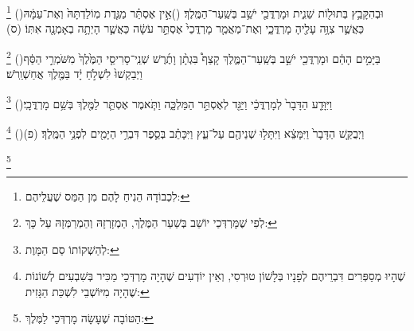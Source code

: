\documentclass[12pt, openany]{book}
\newcommand{\footnotecomment}[1]{
	\renewcommand\thefootnote{}
	\footnote{\textsf{#1}}}
\newcommand{\commenta}[1]{\footnotecomment{#1}\hspace{0em}}
\newcommand{\vsnum}[1]{(\hebrewnumeral{#1})\space}
\begin{document}
\begin{multicols}{2}
\commenta{ לִכְבוֹדָהּ הֵנִיחַ לָהֶם מִן הַמַּס שֶׁעֲלֵיהֶם:}%
\vsnum{19}וּבְהִקָּבֵ֥ץ בְּתוּל֖וֹת שֵׁנִ֑ית וּמָרְדֳּכַ֖י יֹשֵׁ֥ב בְּשַֽׁעַר־הַמֶּֽלֶךְ׃
\vsnum{20}אֵ֣ין אֶסְתֵּ֗ר מַגֶּ֤דֶת מֽוֹלַדְתָּהּ֙ וְאֶת־עַמָּ֔הּ כַּאֲשֶׁ֛ר צִוָּ֥ה עָלֶ֖יהָ מָרְדֳּכָ֑י וְאֶת־מַאֲמַ֤ר מָרְדֳּכַי֙ אֶסְתֵּ֣ר עֹשָׂ֔ה כַּאֲשֶׁ֛ר הָיְתָ֥ה בְאָמְנָ֖ה אִתּֽוֹ׃ (ס)%
\commenta{ לְפִי שֶׁמָּרְדְּכַי יוֹשֵׁב בְּשַׁעַר הַמֶּלֶךְ, הַמְזָרְזָהּ וְהַמְרַמְּזָהּ עַל כָּךְ: }%
\vsnum{21}בַּיָּמִ֣ים הָהֵ֔ם וּמָרְדֳּכַ֖י יֹשֵׁ֣ב בְּשַֽׁעַר־הַמֶּ֑לֶךְ קָצַף֩ בִּגְתָ֨ן וָתֶ֜רֶשׁ שְׁנֵֽי־סָרִיסֵ֤י הַמֶּ֙לֶךְ֙ מִשֹּׁמְרֵ֣י הַסַּ֔ף וַיְבַקְשׁוּ֙ לִשְׁלֹ֣חַ יָ֔ד בַּמֶּ֖לֶךְ אֲחַשְׁוֵֽרֹשׁ׃%
\commenta{ לְהַשְׁקוֹתוֹ סַם הַמָּוֶת:}%
\vsnum{22}וַיִּוָּדַ֤ע הַדָּבָר֙ לְמָרְדֳּכַ֔י וַיַּגֵּ֖ד לְאֶסְתֵּ֣ר הַמַּלְכָּ֑ה וַתֹּ֧אמֶר אֶסְתֵּ֛ר לַמֶּ֖לֶךְ בְּשֵׁ֥ם מָרְדֳּכָֽי׃%
\commenta{ שֶׁהָיוּ מְסַפְּרִים דִּבְרֵיהֶם לְפָנָיו בְּלָשׁוֹן טוּרְסִי, וְאֵין יוֹדְעִים שֶׁהָיָה מָרְדְּכַי מַכִּיר בְּשִׁבְעִים לְשׁוֹנוֹת שֶׁהָיָה מִיּוֹשְׁבֵי לִשְׁכַּת הַגָּזִית: }%
\vsnum{23}וַיְבֻקַּ֤שׁ הַדָּבָר֙ וַיִּמָּצֵ֔א וַיִּתָּל֥וּ שְׁנֵיהֶ֖ם עַל־עֵ֑ץ וַיִּכָּתֵ֗ב בְּסֵ֛פֶר דִּבְרֵ֥י הַיָּמִ֖ים לִפְנֵ֥י הַמֶּֽלֶךְ׃ (פ)%
\commenta{ הַטּוֹבָה שֶׁעָשָׂה מָרְדְּכַי לַמֶּלֶךְ:}%
\end{multicols}\clearpage
\end{document}
